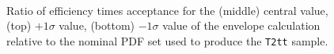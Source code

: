 \begin{figure}[h!]
  \begin{center}
    \\
    \caption{\label{fig:sms-pdf-t2tt}Ratio of efficiency times
      acceptance for the (middle) central value, (top) $+1\sigma$
      value, (bottom) $-1\sigma$ value of the envelope calculation
      relative to the nominal PDF set used to produce the
      \texttt{T2tt} sample. }
  \end{center}
\end{figure}

